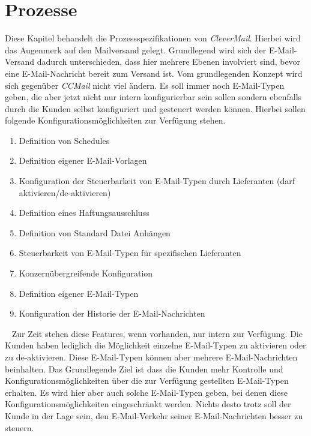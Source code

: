 \section{Prozesse}
\label{sec:clevermail-prozesse}
Diese Kapitel behandelt die Prozessspezifikationen von \emph{CleverMail}. Hierbei wird das Augenmerk auf den Mailversand gelegt. Grundlegend wird sich der E-Mail-Versand dadurch unterschieden, dass hier mehrere Ebenen involviert sind, bevor eine E-Mail-Nachricht bereit zum Versand ist. Vom grundlegenden Konzept wird sich gegenüber \emph{CCMail} nicht viel ändern. Es soll immer noch E-Mail-Typen geben, die aber jetzt nicht nur intern konfigurierbar sein sollen sondern ebenfalls durch die Kunden selbst konfiguriert und gesteuert werden können. Hierbei sollen folgende Konfigurationsmöglichkeiten zur Verfügung stehen.
\begin{enumerate}
	\item Definition von Schedules
	\item Definition eigener E-Mail-Vorlagen
	\item Konfiguration der Steuerbarkeit von E-Mail-Typen durch Lieferanten (darf aktivieren/de-aktivieren)
	\item Definition eines Haftungsausschluss 
	\item Definition von Standard Datei Anhängen
	\item Steuerbarkeit von E-Mail-Typen für spezifischen Lieferanten
	\item Konzernübergreifende Konfiguration
	\item Definition eigener E-Mail-Typen
	\item Konfiguration der Historie der E-Mail-Nachrichten
\end{enumerate}
\ \newline
Zur Zeit stehen diese Features, wenn vorhanden, nur intern zur Verfügung. Die Kunden haben lediglich die Möglichkeit einzelne E-Mail-Typen zu aktivieren oder zu de-aktivieren. Diese E-Mail-Typen können aber mehrere E-Mail-Nachrichten beinhalten. Das Grundlegende Ziel ist dass die Kunden mehr Kontrolle und Konfigurationsmöglichkeiten über die zur Verfügung gestellten E-Mail-Typen erhalten. Es wird hier aber auch solche E-Mail-Typen geben, bei denen diese Konfigurationsmöglichkeiten eingeschränkt werden. Nichts desto trotz soll der Kunde in der Lage sein, den E-Mail-Verkehr seiner E-Mail-Nachrichten besser zu steuern.

\newpage

